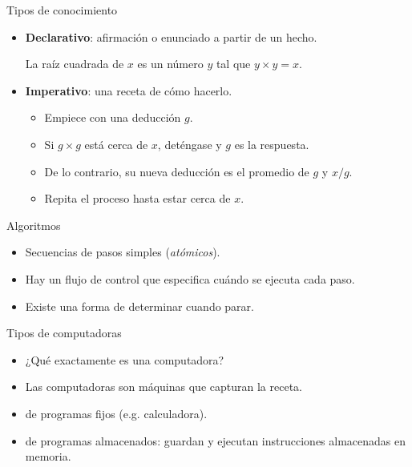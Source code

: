 \documentclass[mathserif]{beamer}
\begin{document}
\begin{frame}{Tipos de conocimiento}
    \begin{itemize}
        \item {\bfseries\orange Declarativo}: afirmación o enunciado a partir de un hecho.
            \begin{blurb}
            La raíz cuadrada de $x$ es un número $y$ tal que $y\times y = x$.
            \end{blurb}
        
        \item {\bfseries\orange Imperativo}: una {\blue receta} de cómo hacerlo.
        \begin{blurb}
            \begin{itemize}
                \item Empiece con una deducción $g$. 
                \item Si $g\times g$ está cerca de $x$, deténgase y $g$ es la respuesta.
                \item De lo contrario, su nueva deducción es el promedio de $g$ y $x/g$.
                \item {\blue Repita} el proceso hasta estar cerca de $x$.
            \end{itemize}
            \end{blurb}
    \end{itemize}
\end{frame}

\begin{frame}{Algoritmos}
    \begin{itemize}
        \item Secuencias de {\blue pasos simples} (\textit{atómicos}).
        \item Hay un {\blue flujo de control} que especifica cuándo se ejecuta cada paso.
        \item Existe una forma de determinar {\blue cuando parar}.
    \end{itemize}
    
\end{frame}

\begin{frame}{Tipos de computadoras}
    \begin{itemize}
        \item ¿Qué exactamente es una computadora?
        \item Las computadoras son {\blue máquinas} que capturan la receta.
        \item de programas {\blue fijos} (e.g. calculadora). 
        \item de programas {\blue almacenados}: guardan y ejecutan instrucciones almacenadas en memoria.
    \end{itemize}
\end{frame}
\end{document}
